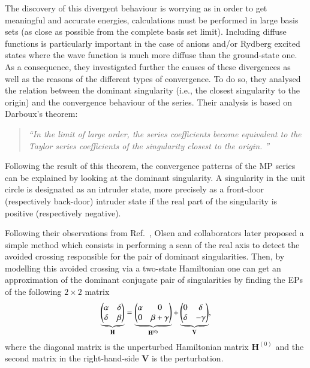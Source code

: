 \documentclass[aps,prb,reprint,noshowkeys,linenumbers,superscriptaddress]{revtex4-1}
\newcommand{\latin}[1]{#1}
\newcommand{\ie}{\latin{i.e.}}
\newcommand{\bH}{\mathbf{H}}
\newcommand{\bV}{\mathbf{V}}
\begin{document}
The discovery of this divergent behaviour is worrying as in order to get meaningful and accurate energies, calculations must be performed in large basis sets (as close as possible from the complete basis set limit). \cite{Loos_2019d,Giner_2019}
Including diffuse functions is particularly important in the case of anions and/or Rydberg excited states where the wave function is much more diffuse than the ground-state one. \cite{Loos_2018a,Loos_2020a}
As a consequence, they investigated further the causes of these divergences as well as the reasons of the different types of convergence. 
To do so, they analysed the relation between the dominant singularity (\ie, the closest singularity to the origin) and the convergence behaviour of the series. \cite{Olsen_2000} Their analysis is based on Darboux's theorem: \cite{Goodson_2011}
\begin{quote}
	\textit{``In the limit of large order, the series coefficients become equivalent to the Taylor series coefficients of the singularity closest to the origin. ''}
\end{quote}
Following the result of this theorem, the convergence patterns of the MP series can be explained by looking at the dominant singularity.
A singularity in the unit circle is designated as an intruder state, more precisely as a front-door (respectively back-door) intruder state if the real part of the singularity is positive (respectively negative). 

Following their observations from Ref.~, Olsen and collaborators later proposed a simple method which consists in performing a scan of the real axis to detect the avoided crossing responsible for the pair of dominant singularities. \cite{Olsen_2000} 
Then, by modelling this avoided crossing via a two-state Hamiltonian one can get an approximation of the dominant conjugate pair of singularities by finding the EPs of the following $2\times2$ matrix
\begin{equation}
	\label{eq:Olsen_2x2}
	\underbrace{\mqty(\alpha & \delta \\ \delta & \beta)}_{\bH} = \underbrace{\mqty(\alpha & 0 \\ 0 & \beta + \gamma )}_{\bH^{(0)}} + \underbrace{\mqty( 0 & \delta \\ \delta & - \gamma)}_{\bV},
\end{equation}
where the diagonal matrix is the unperturbed Hamiltonian matrix $\bH^{(0)}$ and the second matrix in the right-hand-side $\bV$ is the perturbation.
\end{document}
